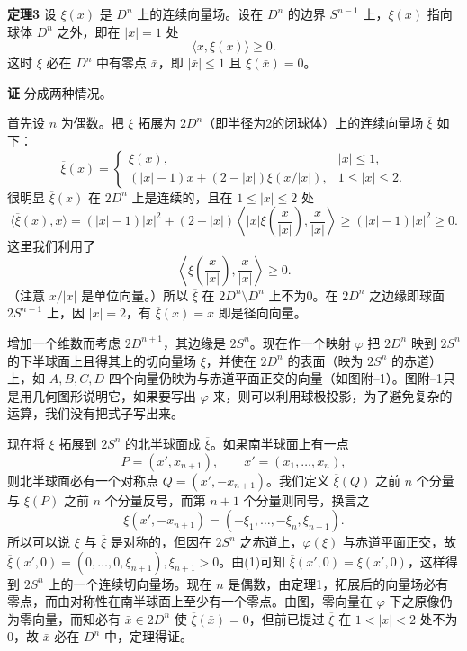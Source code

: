 \noindent\textbf{定理3}\quad
设 $\xi(x)$ 是 $D^n$ 上的连续向量场。设在 $D^n$ 的边界 $S^{n-1}$ 上，$\xi(x)$ 指向球体 $D^n$ 之外，即在 $|x|=1$ 处
\[
 \langle x,\xi(x)\rangle\ge0.
\]
这时 $\xi$ 必在 $D^n$ 中有零点 $\bar x$，即 $|\bar x|\le1$ 且 $\xi(\bar x)=0$。

\noindent\textbf{证}\quad
分成两种情况。

首先设 $n$ 为偶数。把 $\xi$ 拓展为 $2D^n$（即半径为2的闭球体）上的连续向量场 $\overline\xi$ 如下：
\begin{equation}
 \overline\xi(x)=
 \begin{cases}
 \xi(x), & |x|\le1,\\
 (|x|-1)x+(2-|x|)\xi(x/|x|), & 1\le|x|\le2.
 \end{cases}
 \tag{7}
\end{equation}
很明显 $\overline\xi(x)$ 在 $2D^n$ 上是连续的，且在 $1\le|x|\le2$ 处
\[
 \langle\overline\xi(x),x\rangle
 =(|x|-1)|x|^2+(2-|x|)\left\langle |x|\xi\left(\frac{x}{|x|}\right),\frac{x}{|x|}\right\rangle
 \ge(|x|-1)|x|^2\ge0.
\]
这里我们利用了
\[
 \left\langle\xi\left(\frac{x}{|x|}\right),\frac{x}{|x|}\right\rangle\ge0.
\]
（注意 $x/|x|$ 是单位向量。）所以 $\overline\xi$ 在 $2D^n\setminus D^n$ 上不为0。在 $2D^n$ 之边缘即球面 $2S^{n-1}$ 上，因 $|x|=2$，有 $\overline\xi(x)=x$ 即是径向向量。

增加一个维数而考虑 $2D^{n+1}$，其边缘是 $2S^n$。现在作一个映射 $\varphi$ 把 $2D^n$ 映到 $2S^n$ 的下半球面上且得其上的切向量场 $\xi$，并使在 $2D^n$ 的表面（映为 $2S^n$ 的赤道）上，如 $A,B,C,D$ 四个向量仍映为与赤道平面正交的向量（如图附--1）。图附--1只是用几何图形说明它，如果要写出 $\varphi$ 来，则可以利用球极投影，为了避免复杂的运算，我们没有把式子写出来。

现在将 $\xi$ 拓展到 $2S^n$ 的北半球面成 $\overline\xi$。如果南半球面上有一点\[P=(x',x_{n+1}),\qquad x'=(x_1,\ldots,x_n),\]则北半球面必有一个对称点 $Q=(x',-x_{n+1})$。我们定义 $\overline\xi(Q)$ 之前 $n$ 个分量与 $\xi(P)$ 之前 $n$ 个分量反号，而第 $n+1$ 个分量则同号，换言之
\begin{equation}
 \overline\xi(x',-x_{n+1})=(-\xi_1,\ldots,-\xi_n,\xi_{n+1}).
 \tag{8}
\end{equation}
所以可以说 $\xi$ 与 $\overline\xi$ 是对称的，但因在 $2S^n$ 之赤道上，$\varphi(\xi)$ 与赤道平面正交，故 $\overline\xi(x',0)=(0,\ldots,0,\xi_{n+1}),\xi_{n+1}>0$。由(1)可知 $\overline\xi(x',0)=\xi(x',0)$，这样得到 $2S^n$ 上的一个连续切向量场。现在 $n$ 是偶数，由定理1，拓展后的向量场必有零点，而由对称性在南半球面上至少有一个零点。由图，零向量在 $\varphi$ 下之原像仍为零向量，而知必有 $\bar x\in2D^n$ 使 $\overline\xi(\bar x)=0$，但前已提过 $\overline\xi$ 在 $1<|x|<2$ 处不为0，故 $\bar x$ 必在 $D^n$ 中，定理得证。

